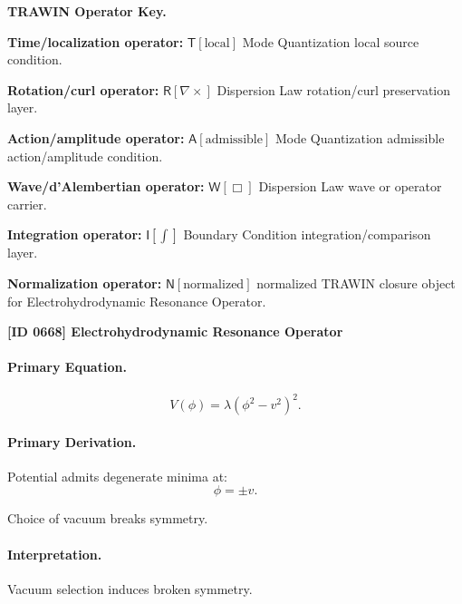 \par\vspace{0.45\baselineskip}
\noindent\begin{minipage}[t]{\linewidth}
\begingroup
\small
\raggedright
\textbf{TRAWIN Operator Key.}\par
\noindent\textbf{Time/localization operator:} $\mathsf{T}\!\left[\mathrm{local}\right]$ Mode Quantization local source condition.\par
\noindent\textbf{Rotation/curl operator:} $\mathsf{R}\!\left[\nabla\times\right]$ Dispersion Law rotation/curl preservation layer.\par
\noindent\textbf{Action/amplitude operator:} $\mathsf{A}\!\left[\mathrm{admissible}\right]$ Mode Quantization admissible action/amplitude condition.\par
\noindent\textbf{Wave/d'Alembertian operator:} $\mathsf{W}\!\left[\Box\right]$ Dispersion Law wave or operator carrier.\par
\noindent\textbf{Integration operator:} $\mathsf{I}\!\left[\int\right]$ Boundary Condition integration/comparison layer.\par
\noindent\textbf{Normalization operator:} $\mathsf{N}\!\left[\mathrm{normalized}\right]$ normalized TRAWIN closure object for Electrohydrodynamic Resonance Operator.\par
\endgroup
\end{minipage}

\clearpage
\noindent\textbf{[ID 0668] Electrohydrodynamic Resonance Operator}\par
\vspace{0.35em}
\paragraph{Primary Equation.}
\begin{equation}
V(\phi) = \lambda(\phi^2 - v^2)^2.
\end{equation}

\paragraph{Primary Derivation.}
Potential admits degenerate minima at:
\begin{equation}
\phi = \pm v.
\end{equation}

Choice of vacuum breaks symmetry.

\paragraph{Interpretation.}
Vacuum selection induces broken symmetry.

